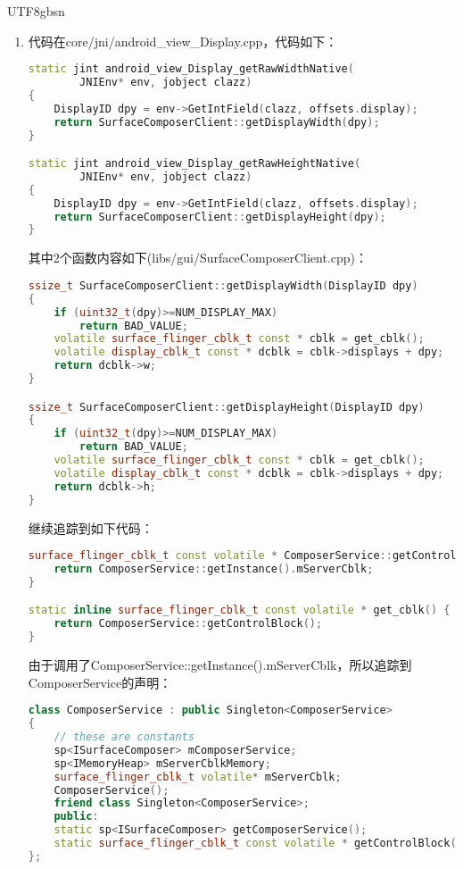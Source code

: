 \documentclass[a4paper,11pt]{article}
\begin{document}
\begin{CJK*}{UTF8}{gbsn}
\begin{enumerate}
\begin{lstlisting}[language=JAVA]
\end{lstlisting}
        可以看到实际上是调用了两个JNI的函数，接下来我们就开始到了C++代码。
        \item 代码在core/jni/android\_view\_Display.cpp，代码如下：
\begin{lstlisting}[language=C++]
static jint android_view_Display_getRawWidthNative(
        JNIEnv* env, jobject clazz)
{
    DisplayID dpy = env->GetIntField(clazz, offsets.display);
    return SurfaceComposerClient::getDisplayWidth(dpy);                                                                                                                                       
}

static jint android_view_Display_getRawHeightNative(
        JNIEnv* env, jobject clazz)
{
    DisplayID dpy = env->GetIntField(clazz, offsets.display);
    return SurfaceComposerClient::getDisplayHeight(dpy);
}
\end{lstlisting}
        其中2个函数内容如下(libs/gui/SurfaceComposerClient.cpp)：
\begin{lstlisting}[language=C++]
ssize_t SurfaceComposerClient::getDisplayWidth(DisplayID dpy)
{
    if (uint32_t(dpy)>=NUM_DISPLAY_MAX)
        return BAD_VALUE;
    volatile surface_flinger_cblk_t const * cblk = get_cblk();
    volatile display_cblk_t const * dcblk = cblk->displays + dpy;
    return dcblk->w;
}                                                                                                                                                                                             

ssize_t SurfaceComposerClient::getDisplayHeight(DisplayID dpy)
{
    if (uint32_t(dpy)>=NUM_DISPLAY_MAX)
        return BAD_VALUE;
    volatile surface_flinger_cblk_t const * cblk = get_cblk();
    volatile display_cblk_t const * dcblk = cblk->displays + dpy;
    return dcblk->h;
}
\end{lstlisting}
       继续追踪到如下代码：
\begin{lstlisting}[language=C++]
surface_flinger_cblk_t const volatile * ComposerService::getControlBlock() {
    return ComposerService::getInstance().mServerCblk;
}

static inline surface_flinger_cblk_t const volatile * get_cblk() {
    return ComposerService::getControlBlock();
}

\end{lstlisting}
        由于调用了ComposerService::getInstance().mServerCblk，所以追踪到ComposerService的声明：
\begin{lstlisting}[language=C++]
class ComposerService : public Singleton<ComposerService>
{
    // these are constants
    sp<ISurfaceComposer> mComposerService;
    sp<IMemoryHeap> mServerCblkMemory;
    surface_flinger_cblk_t volatile* mServerCblk;
    ComposerService();
    friend class Singleton<ComposerService>;
    public:
    static sp<ISurfaceComposer> getComposerService();
    static surface_flinger_cblk_t const volatile * getControlBlock();
};


\end{lstlisting}
\end{enumerate}
\end{CJK*}
\end{document}
